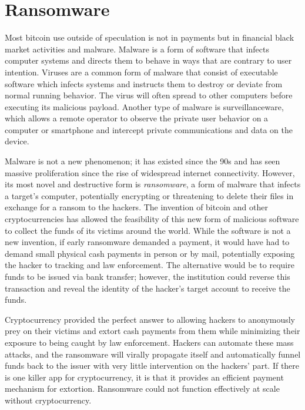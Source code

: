 \chapter{Ransomware}


Most bitcoin use outside of speculation is not in payments but in financial
black market activities and malware. Malware is a form of software that infects
computer systems and directs them to behave in ways that are contrary to user
intention. Viruses are a common form of malware that consist of executable
software which infects systems and instructs them to destroy or deviate from
normal running behavior. The virus will often spread to other computers before
executing its malicious payload. Another type of malware is surveillanceware,
which allows a remote operator to observe the private user behavior on a
computer or smartphone and intercept private communications and data on the
device.

Malware is not a new phenomenon; it has existed since the 90s and has seen
massive proliferation since the rise of widespread internet connectivity.
However, its most novel and destructive form is \textit{ransomware}, a form of
malware that infects a target's computer, potentially encrypting or threatening
to delete their files in exchange for a ransom to the hackers. The invention of
bitcoin and other cryptocurrencies has allowed the feasibility of this new form
of malicious software to collect the funds of its victims around the world.
While the software is not a new invention, if early ransomware demanded a
payment, it would have had to demand small physical cash payments in person or
by mail, potentially exposing the hacker to tracking and law enforcement. The
alternative would be to require funds to be issued via bank transfer; however,
the institution could reverse this transaction and reveal the identity of the
hacker's target account to receive the funds.


Cryptocurrency provided the perfect answer to allowing hackers to anonymously
prey on their victims and extort cash payments from them while minimizing their
exposure to being caught by law enforcement. Hackers can automate these mass
attacks, and the ransomware will virally propagate itself and automatically
funnel funds back to the issuer with very little intervention on the hackers'
part. If there is one killer app for cryptocurrency, it is that it provides an
efficient payment mechanism for extortion. Ransomware could not function
effectively at scale without cryptocurrency.

